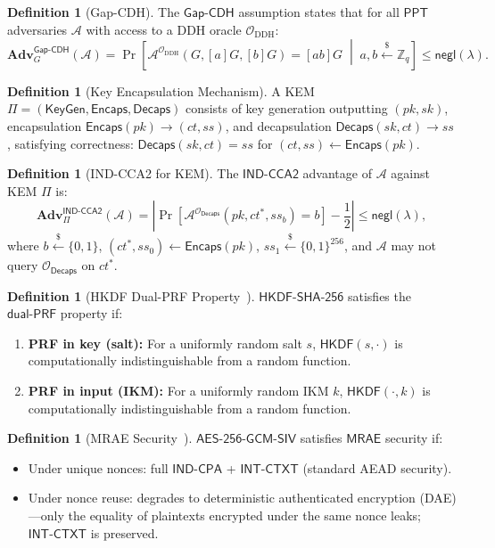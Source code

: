\documentclass[11pt,a4paper]{article}
\theoremstyle{definition}
\newtheorem{definition}[theorem]{Definition}
\newcommand{\secpar}{\lambda}
\newcommand{\negl}{\mathsf{negl}}
\newcommand{\ppt}{\mathsf{PPT}}
\newcommand{\adv}{\mathbf{Adv}}
\newcommand{\advA}{\mathcal{A}}
\newcommand{\oracle}{\mathcal{O}}
\newcommand{\HKDF}{\textsf{HKDF}}
\newcommand{\SHA}{\textsf{SHA-256}}
\newcommand{\AEAD}{\textsf{AES-256-GCM-SIV}}
\newcommand{\KeyGen}{\textsf{KeyGen}}
\newcommand{\Encaps}{\textsf{Encaps}}
\newcommand{\Decaps}{\textsf{Decaps}}
\newcommand{\GapCDH}{\textsf{Gap-CDH}}
\newcommand{\INDCCA}{\textsf{IND-CCA2}}
\newcommand{\INDCPA}{\textsf{IND-CPA}}
\newcommand{\INTCTXT}{\textsf{INT-CTXT}}
\newcommand{\MRAE}{\textsf{MRAE}}
\newcommand{\dualPRF}{\textsf{dual-PRF}}
\newcommand{\getsr}{\stackrel{\$}{\gets}}
\begin{document}
\begin{definition}[Gap-CDH]\label{def:gap-cdh}
The $\GapCDH$ assumption states that for all $\ppt$ adversaries $\advA$ with access to a DDH oracle $\oracle_{\mathrm{DDH}}$:
\[
  \adv^{\GapCDH}_G(\advA) = \Pr\!\left[\advA^{\oracle_{\mathrm{DDH}}}(G, [a]G, [b]G) = [ab]G \;\middle|\; a, b \getsr \mathbb{Z}_q\right] \leq \negl(\secpar).
\]
\end{definition}

\begin{definition}[Key Encapsulation Mechanism]\label{def:kem}
A KEM $\Pi = (\KeyGen, \Encaps, \Decaps)$ consists of key generation outputting $(pk, sk)$, encapsulation $\Encaps(pk) \to (ct, ss)$, and decapsulation $\Decaps(sk, ct) \to ss$, satisfying correctness: $\Decaps(sk, ct) = ss$ for $(ct, ss) \gets \Encaps(pk)$.
\end{definition}

\begin{definition}[IND-CCA2 for KEM]\label{def:ind-cca2}
The $\INDCCA$ advantage of $\advA$ against KEM $\Pi$ is:
\[
  \adv^{\INDCCA}_\Pi(\advA) = \left|\Pr\!\left[\advA^{\oracle_{\Decaps}}(pk, ct^*, ss_b) = b\right] - \frac{1}{2}\right| \leq \negl(\secpar),
\]
where $b \getsr \{0,1\}$, $(ct^*, ss_0) \gets \Encaps(pk)$, $ss_1 \getsr \{0,1\}^{256}$, and $\advA$ may not query $\oracle_{\Decaps}$ on $ct^*$.
\end{definition}

\begin{definition}[HKDF Dual-PRF Property~\cite{krawczyk2010}]\label{def:dual-prf}
$\HKDF$-$\SHA$ satisfies the $\dualPRF$ property if:
\begin{enumerate}
  \item \textbf{PRF in key (salt):} For a uniformly random salt $s$, $\HKDF(s, \cdot)$ is computationally indistinguishable from a random function.
  \item \textbf{PRF in input (IKM):} For a uniformly random IKM $k$, $\HKDF(\cdot, k)$ is computationally indistinguishable from a random function.
\end{enumerate}
\end{definition}

\begin{definition}[MRAE Security~\cite{rfc8452,rogaway2006}]\label{def:mrae}
$\AEAD$ satisfies $\MRAE$ security if:
\begin{itemize}
  \item Under unique nonces: full $\INDCPA$ + $\INTCTXT$ (standard AEAD security).
  \item Under nonce reuse: degrades to deterministic authenticated encryption (DAE)---only the equality of plaintexts encrypted under the same nonce leaks; $\INTCTXT$ is preserved.
\end{itemize}
\end{definition}
\end{document}
